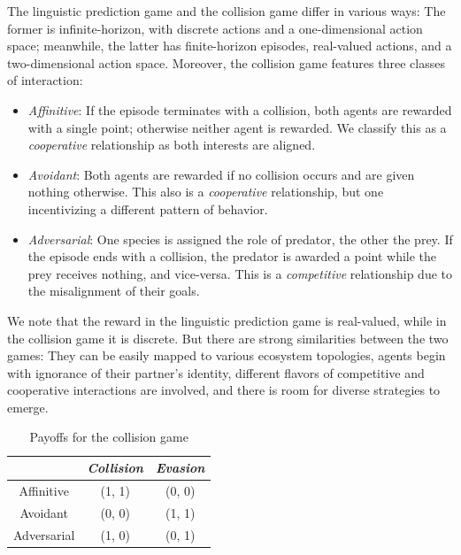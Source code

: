 \documentclass{article}
\begin{document}
The linguistic prediction game and the collision game differ in various ways: 
The former is infinite-horizon, with discrete actions and a one-dimensional action space; 
meanwhile, the latter has finite-horizon episodes, real-valued actions, and a two-dimensional 
action space. Moreover, the collision game features three classes of interaction:
\begin{itemize}
    \item \textit{Affinitive}: If the episode terminates with a collision, both agents are rewarded with a single point; otherwise neither agent is rewarded. We classify this as a \textit{cooperative} relationship as both interests are aligned.
    \item \textit{Avoidant}: Both agents are rewarded if no collision occurs and are given nothing otherwise. This also is a \textit{cooperative} relationship, but one incentivizing a different pattern of behavior.
    \item \textit{Adversarial}: One species is assigned the role of predator, the other the prey. If the episode ends with a collision, the predator is awarded a point while the prey receives nothing, and vice-versa. This is a \textit{competitive} relationship due to the misalignment of their goals.
\end{itemize}
We note that the reward in the linguistic prediction game is real-valued, while in the collision 
game it is discrete. But there are strong similarities between the two games:
They can be easily mapped to various ecosystem topologies, 
agents begin with ignorance of their partner's identity, different flavors of competitive 
and cooperative interactions are involved, and there is room for diverse strategies to emerge.

\begin{table}[t]
    \begin{center}
\begin{tabular}{ c|c|c } 

  & \textit{Collision} & \textit{Evasion} \\ 
 \hline
 Affinitive & (1, 1) & (0, 0) \\ 
 Avoidant & (0, 0) & (1, 1) \\ 
 Adversarial & (1, 0) & (0, 1) \\ 
 \hline
\end{tabular}
        \caption{Payoffs for the collision game}
        \label{fig:payoffs}
    \end{center}
\end{table}
\end{document}

